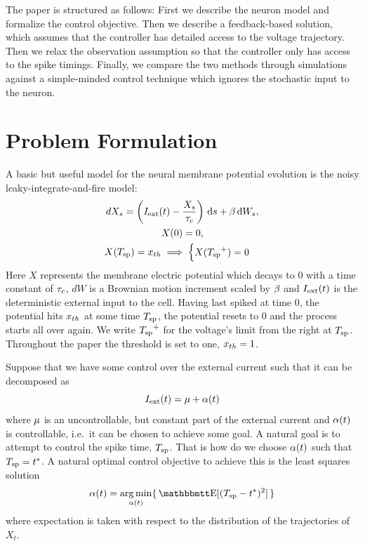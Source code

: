 \documentclass[12pt]{iopart}
\begin{document}
The paper is structured as follows: First we describe the neuron model and
formalize the control objective. Then we describe a feedback-based solution,
which assumes that the controller has detailed access to the voltage trajectory.
Then we relax the observation assumption so that the controller only has access
to the spike timings. Finally, we compare the two methods through
simulations against a simple-minded control technique which ignores
the stochastic input to the neuron.

\section{Problem Formulation}
A basic but useful model for the neural membrane potential evolution is the
noisy leaky-integrate-and-fire model:
\begin{equation}
\begin{gathered}
dX_s = \left({ I_{\textrm{ext}} }(t) - \frac{X_s}{{ \tau_{c} }} \right) \, \mathrm{d} s + {\beta} \, \mathrm{d} W_s,
\\
X(0) = 0,
\\
X({ T_{\textrm{sp} } }) = { x_{th} } \implies
\begin{cases}
X({ T_{\textrm{sp} } }^+) = 0 &
\end{cases}
\end{gathered}
\label{eq:X_evolution_uo}
\end{equation}
Here $X$ represents the membrane electric potential which decays to $0$
with a time constant of ${ \tau_{c} }$, $dW$ is a Brownian motion increment scaled by
${\beta}$ and ${ I_{\textrm{ext}} }(t)$ is the deterministic external input to the cell. Having last
spiked at time $0$, the potential hits ${ x_{th} }$ at some time ${ T_{\textrm{sp} } }$, the potential
resets to $0$ and the process starts all over again. 
We write ${ T_{\textrm{sp} } }^+$ for the voltage's limit from the right at ${ T_{\textrm{sp} } }$.
Throughout the paper the threshold is set to one, ${ x_{th} } = 1$.

Suppose that we have some control over the external current such that it can be
decomposed as
\begin{equation}
{ I_{\textrm{ext}} }(t) = {\mu } + {\alpha}(t)
\label{eq:current_mu_alpha}
\end{equation}
where ${\mu }$ is an uncontrollable, but constant part of the external current and
${\alpha}(t)$ is controllable, i.e.\ it can be chosen to achieve some goal.
A natural goal is to attempt to control the spike time, ${ T_{\textrm{sp} } }$.
That is how do we choose ${\alpha}(t)$ such that ${ T_{\textrm{sp} } } = { t^* }$.
A natural optimal control objective to achieve this is the least squares solution
\begin{equation}
\a(t) = \argmin_{\a(t)} \{\, \Exp[(\ts- \T)^2] \,\}
\label{eq:OC_LS_variance}
\end{equation}
where expectation is taken with respect to the distribution of the trajectories
of $X_t$.
\end{document}
